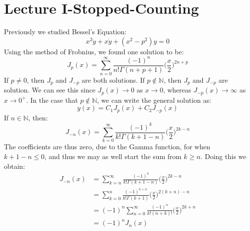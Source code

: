 \documentclass[crop=false,class=book,oneside]{standalone}
\begin{document}
    \section{Lecture I-Stopped-Counting}
        Previously we studied Bessel's Equation:
        \begin{equation}
            x^{2}\ddot{y}+x\dot{y}+(x^{2}-p^{2})y=0
        \end{equation}
        Using the method of Frobnius, we found one solution to be:
        \begin{equation}
            J_{p}(x)=\sum_{n=0}^{\infty}
                \frac{(\minus{1})^{n}}{n!\Gamma(n+p+1)}
                \Big(\frac{x}{2}\Big)^{2n+p}
        \end{equation}
        If $p\ne{0}$, then $J_{p}$ and $J_{\minus{p}}$ are both
        solutions. If $p\notin\mathbb{N}$, then $J_{p}$ and
        $J_{\minus{p}}$ are solution. We can see this since
        $J_{p}(x)\rightarrow{0}$ as $x\rightarrow{0}$, whereas
        $J_{\minus{p}}(x)\rightarrow\infty$ as
        $x\rightarrow{0}^{+}$. In the case that $p\notin\mathbb{N}$,
        we can write the general solution as:
        \begin{equation}
            y(x)=C_{1}J_{p}(x)+C_{2}J_{\minus{p}}(x)
        \end{equation}
        If $n\in\mathbb{N}$, then:
        \begin{equation}
            J_{\minus{n}}(x)=\sum_{k=0}^{\infty}
                \frac{(\minus{1})^{k}}{k!\Gamma(k+1-n)}
                \Big(\frac{x}{2}\Big)^{2k-n}
        \end{equation}
        The coefficients are thus zero, due to the Gamma function,
        for when $k+1-n\leq{0}$, and thus we may as well start
        the sum from $k\geq{n}$. Doing this we obtain:
        \begin{subequations}
            \begin{align}
                J_{\minus{n}}(x)&=\sum_{k=n}^{\infty}
                    \frac{(\minus{1})^{k}}{k!\Gamma(k+1-n)}
                    \Big(\frac{x}{2}\Big)^{2k-n}\\
                &=\sum_{k=0}^{n}
                    \frac{(\minus{1})^{k+n}}{k!\Gamma(k+1)}
                    \Big(\frac{x}{2}\Big)^{2(k+n)-n}\\
                &=(\minus{1})^{n}\sum_{n=0}^{\infty}
                    \frac{(\minus{1})^{n}}{k!(n+k)!}
                    \Big(\frac{x}{2}\Big)^{2k+n}\\
                &=(\minus{1})^{n}J_{n}(x)
            \end{align}
        \end{subequations}
\end{document}

